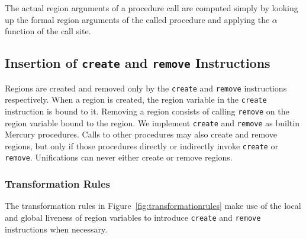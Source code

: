 \documentclass{tlp}
\newcommand{\code}[1]{{\tt#1}}
\begin{document}
The actual region arguments of a procedure call are computed simply
by looking up the formal region arguments of the called procedure
and applying the $\alpha$ function of the call site.

\subsection{Insertion of \code{create} and \code{remove} Instructions}

Regions are created and removed
only by the \code{create} and \code{remove} instructions respectively.
When a region is created,
the region variable in the \code{create} instruction is bound to it.
Removing a region consists of
calling \code{remove} on the region variable bound to the region.
We implement \code{create} and \code{remove}
as builtin Mercury procedures.
Calls to other procedures may also create and remove regions,
but only if those procedures directly or indirectly invoke
\code{create} or \code{remove}.
Unifications can never either create or remove regions.

\subsubsection{Transformation Rules}

The transformation rules in Figure~\ref{fig:transformationrules}
make use of the local and global liveness of region variables
to introduce \code{create} and \code{remove} instructions
when necessary.
\end{document}
